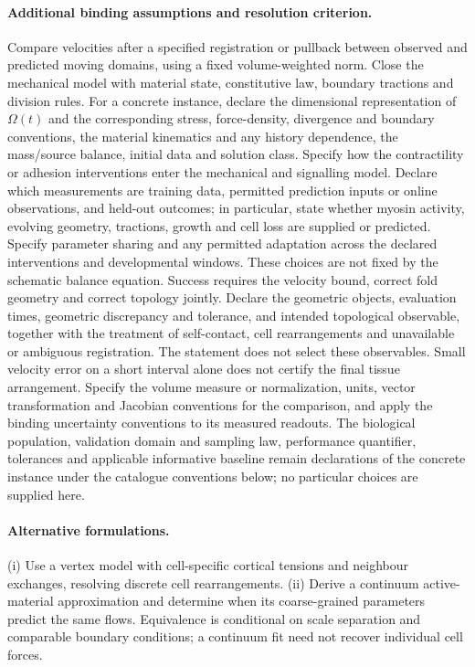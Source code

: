 \documentclass[11pt]{article}
\begin{document}
\paragraph{Additional binding assumptions and resolution criterion.} Compare velocities after a specified registration or pullback between observed and predicted moving domains, using a fixed volume-weighted norm. Close the mechanical model with material state, constitutive law, boundary tractions and division rules. For a concrete instance, declare the dimensional representation of $\Omega(t)$ and the corresponding stress, force-density, divergence and boundary conventions, the material kinematics and any history dependence, the mass/source balance, initial data and solution class. Specify how the contractility or adhesion interventions enter the mechanical and signalling model. Declare which measurements are training data, permitted prediction inputs or online observations, and held-out outcomes; in particular, state whether myosin activity, evolving geometry, tractions, growth and cell loss are supplied or predicted. Specify parameter sharing and any permitted adaptation across the declared interventions and developmental windows. These choices are not fixed by the schematic balance equation. Success requires the velocity bound, correct fold geometry and correct topology jointly. Declare the geometric objects, evaluation times, geometric discrepancy and tolerance, and intended topological observable, together with the treatment of self-contact, cell rearrangements and unavailable or ambiguous registration. The statement does not select these observables. Small velocity error on a short interval alone does not certify the final tissue arrangement. Specify the volume measure or normalization, units, vector transformation and Jacobian conventions for the comparison, and apply the binding uncertainty conventions to its measured readouts. The biological population, validation domain and sampling law, performance quantifier, tolerances and applicable informative baseline remain declarations of the concrete instance under the catalogue conventions below; no particular choices are supplied here.

\paragraph{Alternative formulations.} (i) Use a vertex model with cell-specific cortical tensions and neighbour exchanges, resolving discrete cell rearrangements. (ii) Derive a continuum active-material approximation and determine when its coarse-grained parameters predict the same flows. Equivalence is conditional on scale separation and comparable boundary conditions; a continuum fit need not recover individual cell forces.
\end{document}
